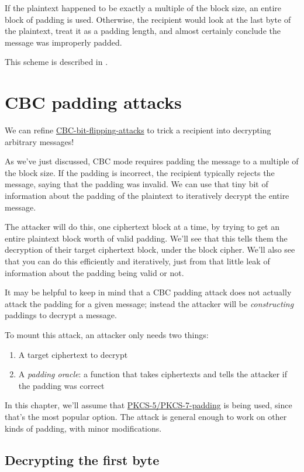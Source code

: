 \documentclass[11pt,ebook,table,dvipsnames]{memoir}
\begin{document}
If the plaintext happened to be exactly a multiple of the block size,
an entire block of padding is used. Otherwise, the recipient would
look at the last byte of the plaintext, treat it as a padding length,
and almost certainly conclude the message was improperly padded.

This scheme is described in \cite{cms:padding}.
\section{CBC padding attacks}
\label{sec-2-3-7}

We can refine \hyperref[CBC bit flipping attacks]{CBC-bit-flipping-attacks} to trick a recipient into
decrypting arbitrary messages!

As we've just discussed, \gls{CBC mode} requires padding the message
to a multiple of the block size. If the padding is incorrect, the
recipient typically rejects the message, saying that the padding was
invalid. We can use that tiny bit of information about the padding of
the plaintext to iteratively decrypt the entire message.

The attacker will do this, one ciphertext block at a time, by trying
to get an entire plaintext block worth of valid padding. We'll see
that this tells them the decryption of their target ciphertext block,
under the block cipher. We'll also see that you can do this
efficiently and iteratively, just from that little leak of information
about the padding being valid or not.

It may be helpful to keep in mind that a CBC padding attack does not
actually attack the padding for a given message; instead the attacker
will be \emph{constructing} paddings to decrypt a message.

To mount this attack, an attacker only needs two things:

\begin{enumerate}
\item A target ciphertext to decrypt
\item A \emph{padding oracle}: a function that takes ciphertexts and tells
the attacker if the padding was correct
\end{enumerate}

In this chapter, we'll assume that \hyperref[PKCS\#5/PKCS\#7 padding]{PKCS-5/PKCS-7-padding} is being
used, since that's the most popular option. The attack is general
enough to work on other kinds of padding, with minor modifications.

\subsection{Decrypting the first byte}
\label{sec-2-3-7-1}
\end{document}
